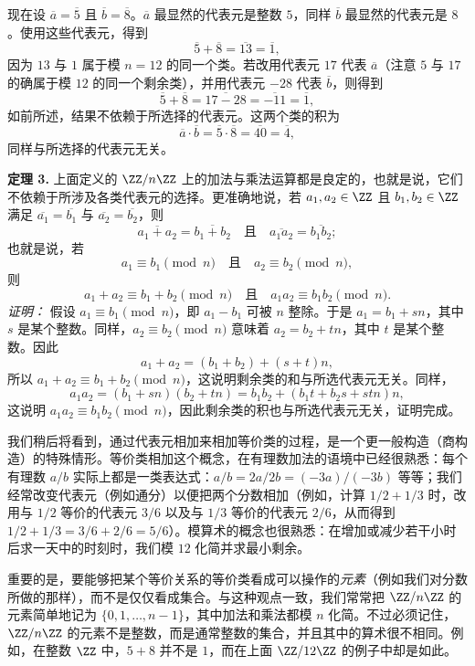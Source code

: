 现在设 $\overline{a}=\overline{5}$ 且 $\overline{b}=\overline{8}$。$\overline{a}$ 最显然的代表元是整数 $5$，同样 $\overline{b}$ 最显然的代表元是 $8$。使用这些代表元，得到
\[
  \overline{5}+\overline{8}=\overline{13}=\overline{1},
\]
因为 $13$ 与 $1$ 属于模 $n=12$ 的同一个类。若改用代表元 $17$ 代表 $\overline{a}$（注意 $5$ 与 $17$ 的确属于模 $12$ 的同一个剩余类），并用代表元 $-28$ 代表 $\overline{b}$，则得到
\[
  \overline{5}+\overline{8}=\overline{17-28}=\overline{-11}=\overline{1},
\]
如前所述，结果不依赖于所选择的代表元。这两个类的积为
\[
  \overline{a}\cdot\overline{b}=\overline{5}\cdot\overline{8}=\overline{40}=\overline{4},
\]
同样与所选择的代表元无关。

\medskip
\noindent\textbf{定理 3.} 上面定义的 $\ZZ/n\ZZ$ 上的加法与乘法运算都是良定的，也就是说，它们不依赖于所涉及各类代表元的选择。更准确地说，若 $a_1,a_2\in\ZZ$ 且 $b_1,b_2\in\ZZ$ 满足 $\overline{a_1}=\overline{b_1}$ 与 $\overline{a_2}=\overline{b_2}$，则
\[
  \overline{a_1+a_2}=\overline{b_1+b_2}
  \quad\text{且}\quad
  \overline{a_1a_2}=\overline{b_1b_2};
\]
也就是说，若
\[
  a_1\equiv b_1\pmod n\quad\text{且}\quad a_2\equiv b_2\pmod n,
\]
则
\[
  a_1+a_2\equiv b_1+b_2\pmod n
  \quad\text{且}\quad
  a_1a_2\equiv b_1b_2\pmod n.
\]
\noindent\textit{证明：} 假设 $a_1\equiv b_1\pmod n$，即 $a_1-b_1$ 可被 $n$ 整除。于是 $a_1=b_1+sn$，其中 $s$ 是某个整数。同样，$a_2\equiv b_2\pmod n$ 意味着 $a_2=b_2+tn$，其中 $t$ 是某个整数。因此
\[
  a_1+a_2=(b_1+b_2)+(s+t)n,
\]
所以 $a_1+a_2\equiv b_1+b_2\pmod n$，这说明剩余类的和与所选代表元无关。同样，
\[
  a_1a_2=(b_1+sn)(b_2+tn)=b_1b_2+(b_1t+b_2s+stn)n,
\]
这说明 $a_1a_2\equiv b_1b_2\pmod n$，因此剩余类的积也与所选代表元无关，证明完成。

我们稍后将看到，通过代表元相加来相加等价类的过程，是一个更一般构造（商构造）的特殊情形。等价类相加这个概念，在有理数加法的语境中已经很熟悉：每个有理数 $a/b$ 实际上都是一类表达式：$a/b=2a/2b=(-3a)/(-3b)$ 等等；我们经常改变代表元（例如通分）以便把两个分数相加（例如，计算 $1/2+1/3$ 时，改用与 $1/2$ 等价的代表元 $3/6$ 以及与 $1/3$ 等价的代表元 $2/6$，从而得到 $1/2+1/3=3/6+2/6=5/6$）。模算术的概念也很熟悉：在增加或减少若干小时后求一天中的时刻时，我们模 $12$ 化简并求最小剩余。

重要的是，要能够把某个等价关系的等价类看成可以操作的\emph{元素}（例如我们对分数所做的那样），而不是仅仅看成集合。与这种观点一致，我们常常把 $\ZZ/n\ZZ$ 的元素简单地记为 $\{0,1,\ldots,n-1\}$，其中加法和乘法都模 $n$ 化简。不过必须记住，$\ZZ/n\ZZ$ 的元素不是整数，而是通常整数的集合，并且其中的算术很不相同。例如，在整数 $\ZZ$ 中，$5+8$ 并不是 $1$，而在上面 $\ZZ/12\ZZ$ 的例子中却是如此。

